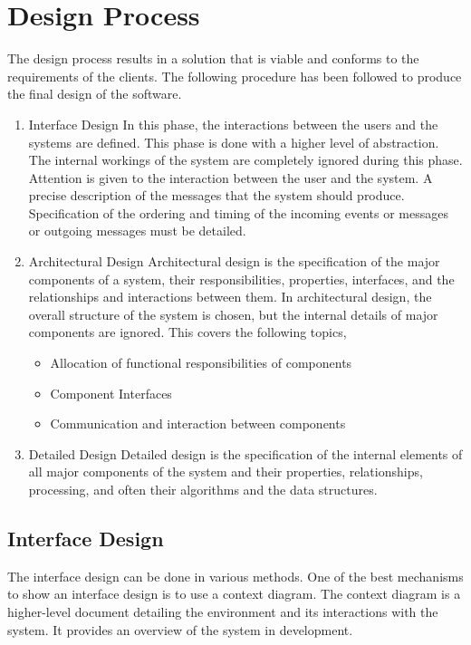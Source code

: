 \documentclass[12pt,a4paper]{report}
\begin{document}
\section{Design Process}
The design process results in a solution that is viable and conforms to the requirements of the clients. The following procedure has been followed to produce the final design of the software.
\begin{enumerate}
\item Interface Design
In this phase, the interactions between the users and the systems are defined. This phase is done with a higher level of abstraction. The internal workings of the system are completely ignored during this phase. Attention is given to the interaction between the user and the system. A precise description of the messages that the system should produce. Specification of the ordering and timing of the incoming events or messages or outgoing messages must be detailed.
\item Architectural Design
Architectural design is the specification of the major components of a system, their responsibilities, properties, interfaces, and the relationships and interactions between them. In architectural design, the overall structure of the system is chosen, but the internal details of major components are ignored.
This covers the following topics, 
\begin{itemize}
	\item Allocation of functional responsibilities of components
	\item Component Interfaces
	\item Communication and interaction between components
\end{itemize}

\item Detailed Design
Detailed design is the specification of the internal elements of all major components of the system and their properties, relationships, processing, and often their algorithms and the data structures. 
\end{enumerate}

\subsection{Interface Design}
The interface design can be done in various methods. One of the best mechanisms to show an interface design is to use a context diagram. The context diagram is a higher-level document detailing the environment and its interactions with the system. It provides an overview of the system in development. 
\end{document}

